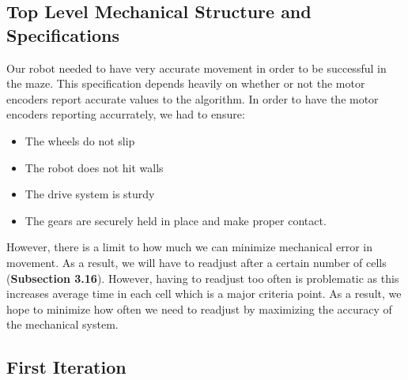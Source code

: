 \documentclass[11pt]{article}
\begin{document}
\subsection{Top Level Mechanical Structure and Specifications}
Our robot needed to have very accurate movement in order to be successful in the maze. This specification depends heavily on whether or not the motor encoders report accurate values to the algorithm. In order to have the motor encoders reporting accurrately, we had to ensure:
\begin{itemize}
\item The wheels do not slip
\item The robot does not hit walls
\item The drive system is sturdy 
\item The gears are securely held in place and make proper contact. 
\end{itemize}
However, there is a limit to how much we can minimize mechanical error in movement. As a result, we will have to readjust after a certain number of cells (\textbf{Subsection 3.16}). However, having to readjust too often is problematic as this increases average time in each cell which is a major criteria point. As a result, we hope to minimize how often we need to readjust by maximizing the accuracy of the mechanical system. 
\newpage

\subsection{First Iteration}
\end{document}
